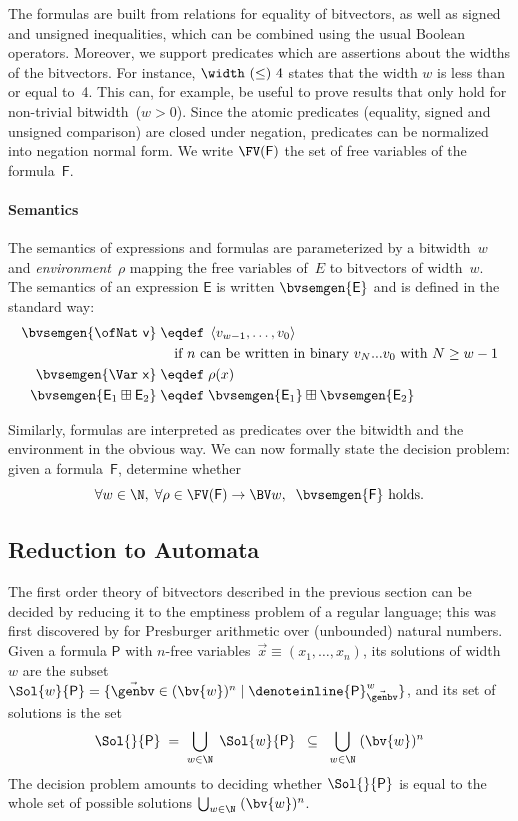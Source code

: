 The formulas are built from relations for equality of bitvectors, as well as
signed and unsigned inequalities, which can be combined using the usual Boolean
operators.
%
Moreover, we support predicates which are assertions about the widths of the bitvectors.
For instance, $\width~{(\leq)}~4$ states that the width $w$
is less than or equal to~4. This can, for example, be useful to prove results
that only hold for non-trivial bitwidth~($w > 0$).
%
Since the atomic predicates (equality, signed and unsigned comparison) are
closed under negation, predicates can be normalized into negation normal form.
%
We write $\FV(\mathsf F)$ the set of free variables of the formula~$\mathsf F$.


\paragraph{Semantics}
The semantics of expressions and formulas are parameterized by a bitwidth~$w$
and \emph{environment}~$\rho$ mapping the free variables of~$E$ to bitvectors of width~$w$.
%
The semantics of an expression $\mathsf{E}$ is written $\bvsemgen{\mathsf{E}}$
and is defined in the standard way:
%
\begin{align*}
  \bvsemgen{\mathsf{\ofNat~v}} \;&\eqdef\; \left< v_{w-1}, \dots, v_0 \right> \\
  &\quad \text{if~$n$ can be written in binary $v_N...v_0$ with $N \geq w-1$}\\
  \bvsemgen{\mathsf{\Var~x}} \;&\eqdef\; \rho(x)\\
  \bvsemgen{\mathsf{E}_1 \boxplus \mathsf{E}_2} \;&\eqdef\;
    \bvsemgen{\mathsf{E}_1} \boxplus \bvsemgen{\mathsf{E}_2}
\end{align*}

\noindent
Similarly, formulas are interpreted as predicates over the bitwidth and the
environment in the obvious way.
%
We can now formally state the decision problem: given a formula~$\mathsf F$,
determine whether
\[
  \forall w \in \N,\; \forall \rho \in \FV(\mathsf F) \to \BV w,\;\; \bvsemgen{\mathsf F} \text{ holds}.
\]

\subsection{Reduction to Automata}
\label{sec:swbv:reduction-to-automata}

The first order theory of bitvectors described in the previous section can be
decided by reducing it to the emptiness problem of a regular language; this was
first discovered by \citet{Büchi1960} for Presburger arithmetic over (unbounded)
natural numbers.
%
Given a formula $\mathsf{P}$ with $n$-free variables~$\vec{x} \equiv (x_1, \dots, x_n)$,
its solutions of
width~$w$ are the subset $\Sol{w}{\mathsf{P}} = \{ \vec\genbv \in (\bv{w})^n \mid
\denoteinline{\mathsf{P}}^w_{\vec\genbv} \}$, and its set of solutions is the set
%
\[
  \Sol{}{\mathsf{P}} \;=\; \bigcup_{w \in \N}\; \Sol{w}{\mathsf{P}}
  \;\;\subseteq\;\;
  \bigcup_{w \in \N}\; (\bv{w})^n
\]
%
The decision problem amounts to deciding whether $\Sol{}{\mathsf{P}}$ is equal
to the whole set of possible solutions $\bigcup_{w \in \N}\; (\bv{w})^n$.

